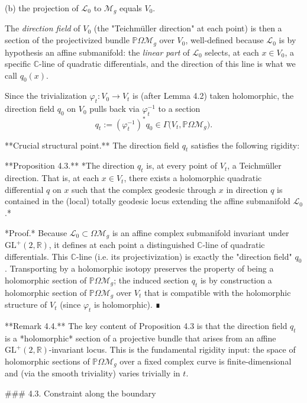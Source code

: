 (b) the projection of $\mathcal{L}_0$ to $\mathcal{M}_g$ equals $V_0$.

The \emph{direction field} of $V_0$ (the "Teichmüller direction" at each point) is then a section of the projectivized bundle $\mathbb{P}\Omega \mathcal{M}_g$ over $V_0$, well-defined because $\mathcal{L}_0$ is by hypothesis an affine submanifold: the \emph{linear part} of $\mathcal{L}_0$ selects, at each $x \in V_0$, a specific $\mathbb{C}$-line of quadratic differentials, and the direction of this line is what we call $q_0(x)$.

Since the trivialization $\varphi_t : V_0 \to V_t$ is (after Lemma 4.2) taken holomorphic, the direction field $q_0$ on $V_0$ pulls back via $\varphi_t^{-1}$ to a section
$$q_t := (\varphi_t^{-1})^* q_0 \in \Gamma\bigl(V_t, \mathbb{P}\Omega \mathcal{M}_g\bigr).$$

**Crucial structural point.** The direction field $q_t$ satisfies the following rigidity:

**Proposition 4.3.** *The direction $q_t$ is, at every point of $V_t$, a Teichmüller direction. That is, at each $x \in V_t$, there exists a holomorphic quadratic differential $q$ on $x$ such that the complex geodesic through $x$ in direction $q$ is contained in the (local) totally geodesic locus extending the affine submanifold $\mathcal{L}_0$.*

*Proof.* Because $\mathcal{L}_0 \subset \Omega \mathcal{M}_g$ is an affine complex submanifold invariant under $\mathrm{GL}^+(2,\mathbb{R})$, it defines at each point a distinguished $\mathbb{C}$-line of quadratic differentials. This $\mathbb{C}$-line (i.e. its projectivization) is exactly the "direction field" $q_0$. Transporting by a holomorphic isotopy preserves the property of being a holomorphic section of $\mathbb{P}\Omega \mathcal{M}_g$; the induced section $q_t$ is by construction a holomorphic section of $\mathbb{P}\Omega \mathcal{M}_g$ over $V_t$ that is compatible with the holomorphic structure of $V_t$ (since $\varphi_t$ is holomorphic). ∎

**Remark 4.4.** The key content of Proposition 4.3 is that the direction field $q_t$ is a *holomorphic* section of a projective bundle that arises from an affine $\mathrm{GL}^+(2,\mathbb{R})$-invariant locus. This is the fundamental rigidity input: the space of holomorphic sections of $\mathbb{P}\Omega \mathcal{M}_g$ over a fixed complex curve is finite-dimensional and (via the smooth triviality) varies trivially in $t$.

### 4.3. Constraint along the boundary

